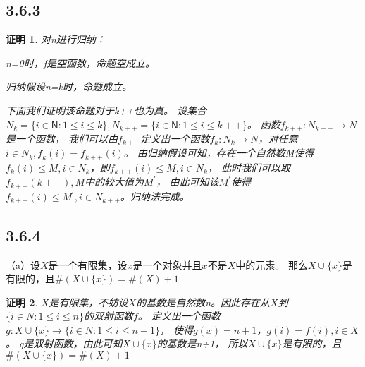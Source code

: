 \documentclass{article}
\theoremstyle{mystyle}
\theoremstyle{zproofstyle}
\newtheorem*{zproof}{证明}
\begin{document}
\subsection*{3.6.3}
\begin{zproof}
  对n进行归纳：

  n=0时，f是空函数，命题空成立。

  归纳假设n=k时，命题成立。

  下面我们证明该命题对于k++也为真。
  设集合$N_k = \{i \in \mathsf{N}: 1 \leq i \leq k\}, N_{k++} = \{i \in \mathsf{N}: 1 \leq i \leq k++\}$。
  函数$f_{k++}: N_{k++} \rightarrow N$是一个函数，
  我们可以由$f_{k++}$定义出一个函数$f_k: N_k \rightarrow N$，对任意$i \in N_k, f_k(i) = f_{k++}(i)$。
  由归纳假设可知，存在一个自然数M使得$f_k(i) \leq M, i \in N_k$，即$f_{k++}(i) \leq M, i \in N_k$，
  此时我们可以取$f_{k++}(k++), M$中的较大值为$M^\prime$，
  由此可知该$M^\prime$使得$f_{k++}(i) \leq M^\prime, i \in N_{k++}$。归纳法完成。
\end{zproof}

\subsection*{3.6.4}

（a）设$X$是一个有限集，设$x$是一个对象并且$x$不是$X$中的元素。
那么$X \cup \{x\}$是有限的，且$\# (X \cup \{x\}) = \# (X) + 1$
\begin{zproof}
  $X$是有限集，不妨设$X$的基数是自然数n。因此存在从$X$到$\{i \in N: 1 \leq i \leq n\}$的双射函数$f$。
  定义出一个函数$g: X \cup \{x\} \rightarrow \{i \in N: 1 \leq i \leq n+1\}$，
  使得$g(x) = n+1$，$g(i) = f(i), i \in X$。
  g是双射函数，由此可知$X \cup \{x\}$的基数是n+1，
  所以$X \cup \{x\}$是有限的，且$\# (X \cup \{x\}) = \# (X) + 1$
\end{zproof}
\end{document}
